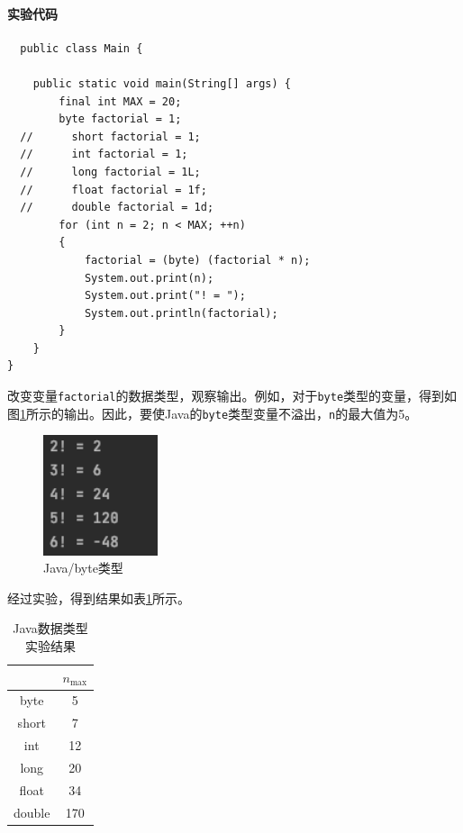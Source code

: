 \documentclass[11pt]{homework}
\begin{document}
\paragraph{实验代码}
\lstset{language=java}
\begin{lstlisting}
  public class Main {

    public static void main(String[] args) {
        final int MAX = 20;
        byte factorial = 1;
  //      short factorial = 1;
  //      int factorial = 1;
  //      long factorial = 1L;
  //      float factorial = 1f;
  //      double factorial = 1d;
        for (int n = 2; n < MAX; ++n)
        {
            factorial = (byte) (factorial * n);
            System.out.print(n);
            System.out.print("! = ");
            System.out.println(factorial);
        }
    }
}
\end{lstlisting}

改变变量\verb|factorial|的数据类型，观察输出。例如，对于\verb|byte|类型的变量，得到如图\ref{java_byte}所示的输出。因此，要使Java的\verb|byte|类型变量不溢出，\verb|n|的最大值为5。
\begin{figure}
  \centering
  \includegraphics[width=0.3\textwidth]{java_byte}
  \caption{Java/byte类型}
  \label{java_byte}
\end{figure}

经过实验，得到结果如表\ref{java_result}所示。
\begin{table}[]
  \centering
  \begin{tabular}{|c|c|}
  \hline
         & $n_{\max}$ \\ \hline
  byte   & 5          \\ \hline
  short  & 7          \\ \hline
  int    & 12         \\ \hline
  long   & 20         \\ \hline
  float  & 34         \\ \hline
  double & 170        \\ \hline
  \end{tabular}
  \caption{Java数据类型实验结果}
  \label{java_result}
\end{table}
\end{document}
